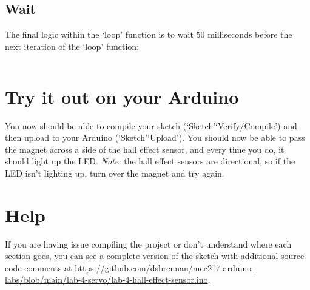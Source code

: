 \documentclass[11pt,a4paper]{article}
\begin{document}
\subsection{Wait}
The final logic within the `loop' function is to wait 50 milliseconds before the next iteration of the `loop' function:\\
\vspace{-1.75em}
\inputminted{arduino}{./src/8-loop-sleep.txt}
\vspace{.75em}

\section*{Try it out on your Arduino}
You now should be able to compile your sketch (`Sketch'\textrightarrow `Verify/Compile') and then upload to your Arduino (`Sketch'\textrightarrow `Upload'). You should now be able to pass the magnet across a side of the hall effect sensor, and every time you do, it should light up the LED. \textit{Note:} the hall effect sensors are directional, so if the LED isn't lighting up, turn over the magnet and try again.

\section*{Help}
If you are having issue compiling the project or don't understand where each section goes, you can see a complete version of the sketch with additional source code comments at \url{https://github.com/dsbrennan/mec217-arduino-labs/blob/main/lab-4-servo/lab-4-hall-effect-sensor.ino}.

\begin{center}
\end{center}
\end{document}

